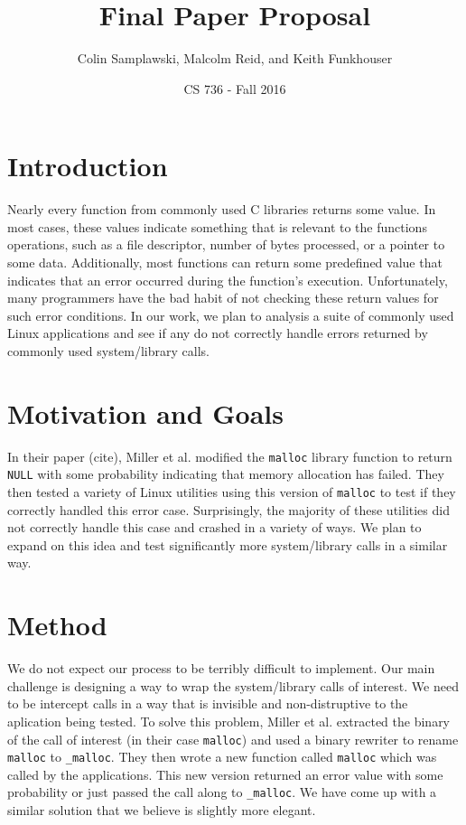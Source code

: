 \documentclass[10pt]{article}
\title{Final Paper Proposal}
\author{Colin Samplawski, Malcolm Reid, and Keith Funkhouser}
\date{CS 736 - Fall 2016}
\begin{document}
\maketitle
\setlength{\baselineskip}{18pt}
\section{Introduction}
Nearly every function from commonly used C libraries returns some value. In most cases, these values indicate something that is relevant to the  functions operations, such as a file descriptor, number of bytes processed, or a pointer to some data. Additionally, most functions can return some predefined value that indicates that an error occurred during the function's execution. Unfortunately, many programmers have the bad habit of not checking these return values for such error conditions. In our work, we plan to analysis a suite of commonly used Linux applications and see if any do not correctly handle errors returned by commonly used system/library calls.

\section{Motivation and Goals}
In their paper (cite), Miller et al. modified the \texttt{malloc} library function to return \texttt{NULL} with some probability indicating that memory allocation has failed. They then tested a variety of Linux utilities using this version of \texttt{malloc} to test if they correctly handled this error case. Surprisingly, the majority of these utilities did not correctly handle this case and crashed in a variety of ways. We plan to expand on this idea and test significantly more system/library calls in a similar way.

\section{Method}
We do not expect our process to be terribly difficult to implement. Our main challenge is designing a way to wrap the system/library calls of interest. We need to be intercept calls in a way that is invisible and non-distruptive to the aplication being tested. To solve this problem, Miller et al. extracted the binary of the call of interest (in their case \texttt{malloc}) and used a binary rewriter to rename \texttt{malloc} to \texttt{\_malloc}. They then wrote a new function called \texttt{malloc} which was called by the applications. This new version returned an error value with some probability or just passed the call along to \texttt{\_malloc}. We have come up with a similar solution that we believe is slightly more elegant.
\end{document}
